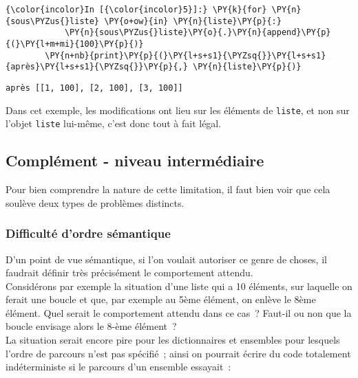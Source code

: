     \begin{Verbatim}[commandchars=\\\{\}]
{\color{incolor}In [{\color{incolor}5}]:} \PY{k}{for} \PY{n}{sous\PYZus{}liste} \PY{o+ow}{in} \PY{n}{liste}\PY{p}{:}
            \PY{n}{sous\PYZus{}liste}\PY{o}{.}\PY{n}{append}\PY{p}{(}\PY{l+m+mi}{100}\PY{p}{)}
        \PY{n+nb}{print}\PY{p}{(}\PY{l+s+s1}{\PYZsq{}}\PY{l+s+s1}{après}\PY{l+s+s1}{\PYZsq{}}\PY{p}{,} \PY{n}{liste}\PY{p}{)}
\end{Verbatim}


    \begin{Verbatim}[commandchars=\\\{\}]
après [[1, 100], [2, 100], [3, 100]]

    \end{Verbatim}

    Dans cet exemple, les modifications ont lieu sur les éléments de
\texttt{liste}, et non sur l'objet \texttt{liste} lui-même, c'est donc
tout à fait légal.

    \hypertarget{compluxe9ment---niveau-intermuxe9diaire}{%
\subsection{Complément - niveau
intermédiaire}\label{compluxe9ment---niveau-intermuxe9diaire}}

    Pour bien comprendre la nature de cette limitation, il faut bien voir
que cela soulève deux types de problèmes distincts.

    \hypertarget{difficultuxe9-dordre-suxe9mantique}{%
\subsubsection{Difficulté d'ordre
sémantique}\label{difficultuxe9-dordre-suxe9mantique}}

    D'un point de vue sémantique, si l'on voulait autoriser ce genre de
choses, il faudrait définir très précisément le comportement attendu.\\

Considérons par exemple la situation d'une liste qui a 10 éléments, sur
laquelle on ferait une boucle et que, par exemple au 5ème élément, on
enlève le 8ème élément. Quel serait le comportement attendu dans ce
cas~? Faut-il ou non que la boucle envisage alors le 8-ème élément~?\\

La situation serait encore pire pour les dictionnaires et ensembles pour
lesquels l'ordre de parcours n'est pas spécifié~; ainsi on pourrait
écrire du code totalement indéterministe si le parcours d'un ensemble
essayait~:

